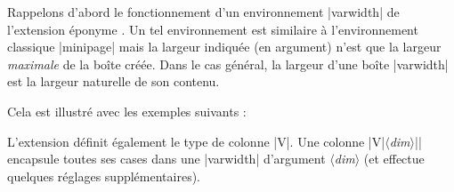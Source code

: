 \documentclass[dvipsnames]{article}%
\begin{document}
\label{varwidth}

Rappelons d'abord le fonctionnement d'un environnement |{varwidth}| de
l'extension éponyme . Un tel environnement est similaire à
l'environnement classique |{minipage}| mais la largeur indiquée (en argument)
n'est que la largeur \emph{maximale} de la boîte créée. Dans le cas général, la
largeur d'une boîte |{varwidth}| est la largeur naturelle de son contenu.

\smallskip
Cela est illustré avec les exemples suivants :

\medskip
\begin{Code}[width=6cm]
\end{Code}

\bigskip
\begin{Code}[width=6cm]
\end{Code}

\bigskip
L'extension  définit également le type de colonne |V|. Une colonne
|V{|$\langle$\textsl{dim}$\rangle$|}| encapsule toutes ses cases dans une
|{varwidth}| d'argument $\langle$\textsl{dim}$\rangle$ (et effectue quelques
réglages supplémentaires).
\end{document}
